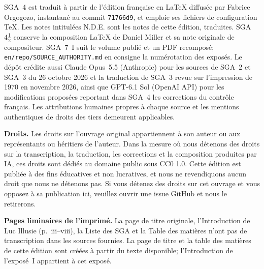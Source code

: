 SGA~4 est traduit \`a partir de l'\'edition fran\c{c}aise en LaTeX diffus\'ee par Fabrice Orgogozo, instantan\'e au commit \texttt{71766d9}, et emploie ses fichiers de configuration TeX. Les notes intitul\'ees \og N.D.E.\fg{} sont les notes de cette \'edition, traduites. SGA~$4\frac12$ conserve la composition LaTeX de Daniel Miller et sa note originale de compositeur. SGA~7~I suit le volume publi\'e et un PDF recompos\'e; \texttt{en/repo/SOURCE\_AUTHORITY.md} en consigne la num\'erotation des expos\'es. Le d\'ep\^ot cr\'edite aussi Claude Opus~5.5 (Anthropic) pour les sources de SGA~2 et SGA~3 du 26 octobre 2026 et la traduction de SGA~3 revue sur l'impression de 1970 en novembre 2026, ainsi que GPT-6.1 Sol (OpenAI API) pour les modifications propos\'ees reportant dans SGA~4 les corrections du contr\^ole fran\c{c}ais. Les attributions humaines propres \`a chaque source et les mentions authentiques de droits des tiers demeurent applicables.

\noindent\textbf{Droits.} Les droits sur l'ouvrage original appartiennent \`a son auteur ou aux repr\'esentants ou h\'eritiers de l'auteur. Dans la mesure o\`u nous d\'etenons des droits sur la transcription, la traduction, les corrections et la composition produites par IA, ces droits sont d\'edi\'es au domaine public sous CC0 1.0. Cette \'edition est publi\'ee \`a des fins \'educatives et non lucratives, et nous ne revendiquons aucun droit que nous ne d\'etenons pas. Si vous d\'etenez des droits sur cet ouvrage et vous opposez \`a sa publication ici, veuillez ouvrir une issue GitHub et nous le retirerons.

\noindent\textbf{Pages liminaires de l'imprim\'e.} La page de titre originale, l'Introduction de Luc Illusie (p.~iii--viii), la Liste des SGA et la Table des mati\`eres n'ont pas de transcription dans les sources fournies. La page de titre et la table des mati\`eres de cette \'edition sont cr\'e\'ees \`a partir du texte disponible; l'Introduction de l'expos\'e~I appartient \`a cet expos\'e.
\endgroup
\clearpage
